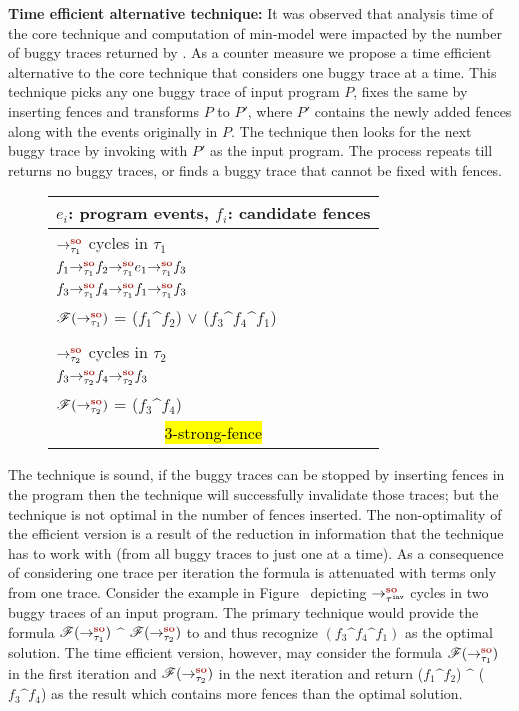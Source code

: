 {\bf Time efficient alternative technique:} It was observed that analysis
time of the core technique and \z computation of min-model were impacted
by the number of buggy traces returned by \cds.
%
As a counter measure we propose a time efficient alternative to the core 
technique that considers one buggy trace at a time.
%
This technique picks any one buggy trace of input program $P$,
fixes the same by inserting fences and  transforms $P$ to $P'$,
where $P'$ contains the newly added fences along with the events 
originally in $P$. 
%
The technique then looks for the next buggy trace by invoking \cds 
with $P'$ as the input program. 
The process repeats till \cds returns no buggy traces, or
finds a buggy trace that cannot be fixed with \cc fences.

\begin{wrapfigure}{l}{0.45\textwidth}
	\vspace{-2.5em}
	\begin{tabular}{|l|}
		\multicolumn{1}{r}{\scriptsize $e_i$: program events,
			$f_i$: candidate fences} \\
		
		\hline
		$\so{\tau_1}{}{}$ cycles in $\tau_1$\\
		\tab$\so{\tau_1}{\so{\tau_1}{\so{\tau_1}{f_1}{f_2}}{e_1}}{f_3}$\\
		\tab$\so{\tau_1}{\so{\tau_1}{\so{\tau_1}{f_3}{f_4}}{f_1}}{f_3}$\\
		$\formula{\so{\tau_1}{}{}}$ = ($f_1 \^ f_2$) $\vee$ ($f_3 \^ f_4 \^ f_1$)\\
		\\
		$\so{\tau_2}{}{}$ cycles in $\tau_2$\\
		\tab$\so{\tau_2}{\so{\tau_2}{f_3}{f_4}}{f_3}$\\
		$\formula{\so{\tau_2}{}{}}$ = ($f_3 \^ f_4$)\\
		\hline
				
		\multicolumn{1}{c}{\footnotesize\hl{3-strong-fence}}
	\end{tabular}
	\vspace{-3em}
\end{wrapfigure}

The technique is sound, \ie if the buggy traces can be stopped by 
inserting \cc fences in the program then the technique will successfully
invalidate those traces;
but the technique is not optimal in the number of fences inserted.
The non-optimality of the efficient version is a result of the reduction
in information that the technique has to work with (from all buggy traces
to just one at a time). As a consequence of considering one trace per
iteration the \z formula is attenuated with terms only from one trace.
%
Consider the example in Figure~ 
depicting $\setSO$ cycles in 
two buggy traces of an input program. The primary \ourtechnique 
technique would provide the formula $\formula{\so{\tau_1}{}{}}$ $\^$ 
$\formula{\so{\tau_2}{}{}}$ to \z and thus recognize $(f_3 \^ f_4 \^ f_1)$ 
as the optimal solution.
The time efficient version, however, may consider the formula 
$\formula{\so{\tau_1}{}{}}$ in the first iteration and 
$\formula{\so{\tau_2}{}{}}$ in the next iteration and return  ($f_1 \^ f_2$) 
$\^$ ($f_3 \^ f_4$) as the result which contains more fences than the 
optimal solution.

